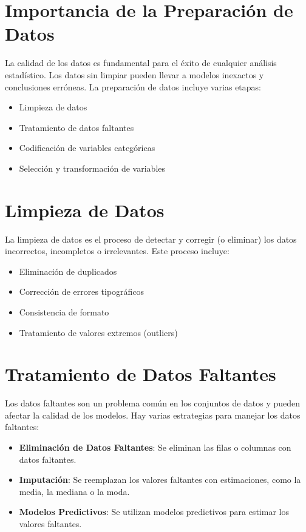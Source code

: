 \documentclass[a4paper]{report} %
\begin{document}
\section{Importancia de la Preparaci\'on de Datos}

La calidad de los datos es fundamental para el \'exito de cualquier an\'alisis estad\'istico. Los datos sin limpiar pueden llevar a modelos inexactos y conclusiones err\'oneas. La preparaci\'on de datos incluye varias etapas:
\begin{itemize}
    \item Limpieza de datos
    \item Tratamiento de datos faltantes
    \item Codificaci\'on de variables categ\'oricas
    \item Selecci\'on y transformaci\'on de variables
\end{itemize}

\section{Limpieza de Datos}

La limpieza de datos es el proceso de detectar y corregir (o eliminar) los datos incorrectos, incompletos o irrelevantes. Este proceso incluye:
\begin{itemize}
    \item Eliminaci\'on de duplicados
    \item Correcci\'on de errores tipogr\'aficos
    \item Consistencia de formato
    \item Tratamiento de valores extremos (outliers)
\end{itemize}

\section{Tratamiento de Datos Faltantes}

Los datos faltantes son un problema com\'un en los conjuntos de datos y pueden afectar la calidad de los modelos. Hay varias estrategias para manejar los datos faltantes:
\begin{itemize}
    \item \textbf{Eliminaci\'on de Datos Faltantes}: Se eliminan las filas o columnas con datos faltantes.
    \item \textbf{Imputaci\'on}: Se reemplazan los valores faltantes con estimaciones, como la media, la mediana o la moda.
    \item \textbf{Modelos Predictivos}: Se utilizan modelos predictivos para estimar los valores faltantes.
\end{itemize}
\end{document}
